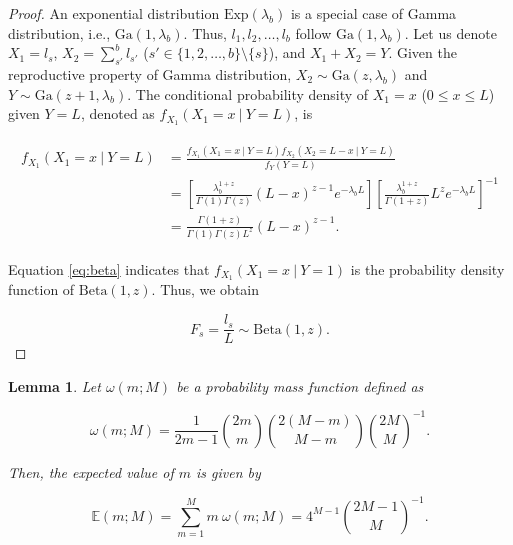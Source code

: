 \documentclass[11pt, class=article, crop=false]{standalone}
\newtheorem{lemma}{Lemma}[subsection]
\theoremstyle{definition}
\begin{document}
\begin{proof}
An exponential distribution $\mbox{Exp}(\lambda_b)$ is a special case of Gamma distribution, i.e., $\mbox{Ga}(1, \lambda_b)$.
Thus, $l_1, l_2, \ldots, l_b$  follow $\mbox{Ga}(1, \lambda_b)$.
Let us denote $X_1 = l_s$, $X_2 = \sum_{s'}^b l_{s'}$ ($s' \in \{1,2, \ldots, b\} \setminus \{s\}$), and $X_1 + X_2 = Y$.
Given the reproductive property of Gamma distribution, $X_2 \sim \mbox{Ga}(z, \lambda_b)$ and $Y \sim \mbox{Ga}(z + 1, \lambda_b)$.
The conditional probability density of $X_1 = x$ ($0 \le x \le L$) given $Y = L$, denoted as $f_{X_1}(X_1 = x~|~Y = L)$, is

\begin{align}
    \begin{split}
        f_{X_1}(X_1 = x~|~Y = L)
        &= \frac{f_{X_1}(X_1 = x~|~Y = L) f_{X_2}(X_2 = L - x~|~Y = L)}{f_Y(Y = L)}\\
        &= 
        \left[
        \frac{\lambda_b^{1 + z}}{\Gamma(1) \Gamma(z)} (L - x)^{z - 1} e^{-\lambda_b L}
        \right]
        \left[
        \frac{\lambda_b^{1 + z}}{\Gamma(1 + z)} L^{z} e^{-\lambda_b L}
        \right]^{-1}\\
        &= \frac{\Gamma(1 + z)}{\Gamma(1) \Gamma(z) L^{z}} (L - x)^{z - 1}.
    \end{split}
    \label{eq:beta}
\end{align}

Equation \ref{eq:beta} indicates that $f_{X_1}(X_1 = x~|~Y = 1)$ is the probability density function of $\mbox{Beta}(1, z)$.
Thus, we obtain

\begin{equation}
    F_s=\frac{l_s}{L} \sim \mbox{Beta} (1, z).
\end{equation}

\end{proof}

\begin{lemma}
\label{lemma-m}
Let $\omega(m; M)$ be a probability mass function defined as

\begin{equation}
    \omega(m; M) = \frac{1}{2m - 1} \binom{2m}{m} \binom{2(M - m)}{M - m} \binom{2M}{M}^{-1}.
\end{equation}

Then, the expected value of $m$ is given by

\begin{equation}
    \mathbb{E}(m; M) = \sum_{m = 1}^M m~\omega(m; M) = 4^{M-1} \binom{2M-1}{M}^{-1}.
\end{equation}
\end{lemma}
\end{document}
